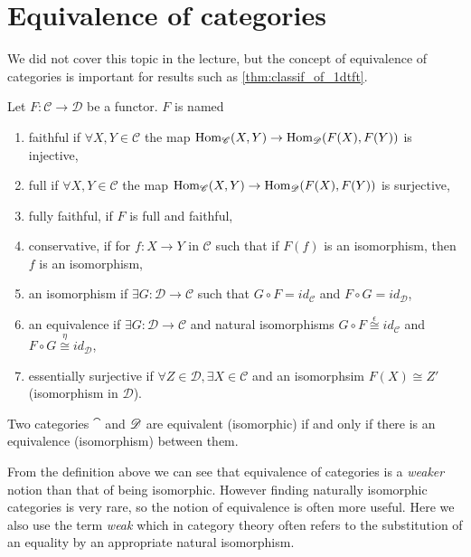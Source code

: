 \section{Equivalence of categories \extra} %
\label{sub:equivalence_of_categories}

We did not cover this topic in the lecture, but the concept of equivalence of categories is important for results such as \ref{thm:classif_of_1dtft}.
\begin{defn}
    Let $F:\mathscr{C}\rightarrow\mathscr{D}$ be a functor. $F$ is named \begin{enumerate}
        \item faithful if $\forall X,Y\in\mathscr{C}$ the map $\operatorname{Hom}_{\mathscr{C}}(X,Y)\rightarrow \operatorname{Hom}_{\mathscr{D}}(F(X),F(Y))$ is injective,
        \item full if $\forall X,Y\in\mathscr{C}$ the map $\operatorname{Hom}_{\mathscr{C}}(X,Y)\rightarrow \operatorname{Hom}_{\mathscr{D}}(F(X),F(Y))$ is surjective,
        \item fully faithful, if $F$ is full and faithful,
        \item conservative, if for $f:X\rightarrow Y$ in $\mathscr{C}$ such that if $F(f)$ is an isomorphism, then $f$ is an isomorphism,
        \item an isomorphism if $\exists G:\mathscr{D}\rightarrow\mathscr{C}$ such that $G\circ F=id_{\mathscr{C}}$ and $F\circ G=id_{\mathscr{D}}$,
        \item an equivalence if $\exists G:\mathscr{D}\rightarrow\mathscr{C}$ and natural isomorphisms $G\circ F\overset{\epsilon}{\cong}id_{\mathscr{C}}$ and $F\circ G\overset{\eta}{\cong}id_{\mathscr{D}}$,
        \item essentially surjective if $\forall Z\in\mathscr{D}, \exists X\in\mathscr{C}$ and an isomorphsim $F(X)\cong Z'$ (isomorphism in $\mathscr{D}$).
    \end{enumerate}
\end{defn}
\begin{defn}
    Two categories $\cat$ and $\mathscr{D}$ are equivalent (isomorphic) if and only if there is an equivalence (isomorphism) between them.
\end{defn}
From the definition above we can see that equivalence of categories is a \textit{weaker} notion than that of being isomorphic. However finding naturally isomorphic categories is very rare, so the notion of equivalence is often more useful. Here we also use the term \textit{weak} which in category theory often refers to the substitution of an equality by an appropriate natural isomorphism.

